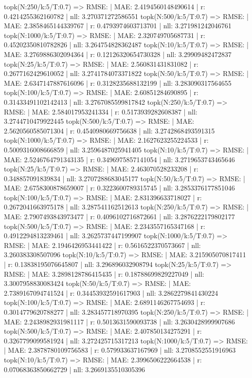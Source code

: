 topk(N:250/k:5/T:0.7) => RMSE: | MAE: 2.4194560148490614 | r: 0.4214255362160782 | nll: 3.270371272586551
topk(N:500/k:5/T:0.7) => RMSE: | MAE: 2.3858465144339767 | r: 0.4793974603713701 | nll: 3.271981242046761
topk(N:1000/k:5/T:0.7) => RMSE: | MAE: 2.320749705687731 | r: 0.45202350810782826 | nll: 3.264754828362487
topk(N:10/k:5/T:0.7) => RMSE: | MAE: 3.2769886302094364 | r: 0.12126320654730328 | nll: 3.29909482472837
topk(N:25/k:5/T:0.7) => RMSE: | MAE: 2.560831431831082 | r: 0.2677162429610052 | nll: 3.2741784073371822
topk(N:50/k:5/T:0.7) => RMSE: | MAE: 2.6347147887616096 | r: 0.3128235688132199 | nll: 3.283090317564655
topk(N:100/k:5/T:0.7) => RMSE: | MAE: 2.60851284690895 | r: 0.31433491102142413 | nll: 3.2767085599817842
topk(N:250/k:5/T:0.7) => RMSE: | MAE: 2.584017953241334 | r: 0.5173939282608387 | nll: 3.2744710479922445
topk(N:500/k:5/T:0.7) => RMSE: | MAE: 2.5620560585071304 | r: 0.4540980669756638 | nll: 3.2742868493591315
topk(N:1000/k:5/T:0.7) => RMSE: | MAE: 2.1627623255224533 | r: 0.5009316008666859 | nll: 3.2596487025941405
topk(N:10/k:5/T:0.7) => RMSE: | MAE: 2.5246764791343135 | r: 0.3496975857141054 | nll: 3.2719653743465646
topk(N:25/k:5/T:0.7) => RMSE: | MAE: 2.463070528233208 | r: 0.348857091839834 | nll: 3.2707288683045177
topk(N:50/k:5/T:0.7) => RMSE: | MAE: 2.6758300878659007 | r: 0.3223600789315745 | nll: 3.2853376177851046
topk(N:100/k:5/T:0.7) => RMSE: | MAE: 2.831396633718027 | r: 0.2672041663975178 | nll: 3.287541162512613
topk(N:250/k:5/T:0.7) => RMSE: | MAE: 2.7907493843973477 | r: 0.4096102716872661 | nll: 3.2876222179802177
topk(N:500/k:5/T:0.7) => RMSE: | MAE: 2.2343557165347168 | r: 0.4912294813239461 | nll: 3.2625737447199907
topk(N:1000/k:5/T:0.7) => RMSE: | MAE: 2.1946426953441422 | r: 0.5616522370573667 | nll: 3.260383308507096
topk(N:10/k:5/T:0.7) => RMSE: | MAE: 3.215905070817411 | r: 0.13838195076645807 | nll: 3.296896032908794
topk(N:25/k:5/T:0.7) => RMSE: | MAE: 3.2898128786415435 | r: 0.18788699829227049 | nll: 3.3007958830083424
topk(N:50/k:5/T:0.7) => RMSE: | MAE: 2.7389167094741524 | r: 0.34453932591617903 | nll: 3.2862279841430224
topk(N:100/k:5/T:0.7) => RMSE: | MAE: 2.6891146267754693 | r: 0.3014779620788277 | nll: 3.283457718970395
topk(N:250/k:5/T:0.7) => RMSE: | MAE: 2.2438982931981117 | r: 0.5013631590093738 | nll: 3.2630428999907686
topk(N:500/k:5/T:0.7) => RMSE: | MAE: 2.407850134275291 | r: 0.3267799099581924 | nll: 3.272425715317213
topk(N:1000/k:5/T:0.7) => RMSE: | MAE: 2.3878780109756583 | r: 0.579933637167969 | nll: 3.2708552551916963
topk(N:10/k:5/T:0.7) => RMSE: | MAE: 2.3996506222664538 | r: 0.07068363850662729 | nll: 3.2669135510305396
